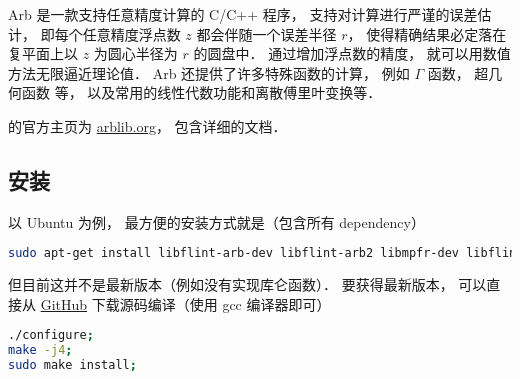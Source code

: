 
Arb 是一款支持任意精度计算的 C/C++ 程序， 支持对计算进行严谨的误差估计， 即每个任意精度浮点数 $z$ 都会伴随一个误差半径 $r$， 使得精确结果必定落在复平面上以 $z$ 为圆心半径为 $r$ 的圆盘中． 通过增加浮点数的精度， 就可以用数值方法无限逼近理论值． Arb 还提供了许多特殊函数的计算， 例如 $\Gamma$ 函数， 超几何函数 等， 以及常用的线性代数功能和离散傅里叶变换等．

的官方主页为 \href{https://arblib.org/}{arblib.org}， 包含详细的文档．

\subsection{安装}
以 Ubuntu 为例， 最方便的安装方式就是（包含所有 dependency）
\begin{lstlisting}[language=bash]
sudo apt-get install libflint-arb-dev libflint-arb2 libmpfr-dev libflint-dev
\end{lstlisting}
但目前这并不是最新版本（例如没有实现库仑函数）． 要获得最新版本， 可以直接从 \href{https://github.com/fredrik-johansson/arb/}{GitHub} 下载源码编译（使用 gcc 编译器即可）
\begin{lstlisting}[language=bash]
./configure;
make -j4;
sudo make install;
\end{lstlisting}
